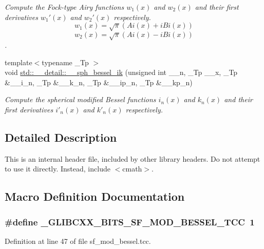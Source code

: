 \begin{DoxyCompactItemize}
\begin{DoxyCompactList}\small\item\em Compute the Fock-\/type Airy functions $ w_1(x) $ and $ w_2(x) $ and their first derivatives $ w_1'(x) $ and $ w_2'(x) $ respectively. \[ w_1(x) = \sqrt{\pi}(Ai(x) + iBi(x)) \] \[ w_2(x) = \sqrt{\pi}(Ai(x) - iBi(x)) \]. \end{DoxyCompactList}\item 
{\footnotesize template$<$typename \+\_\+\+Tp $>$ }\\void \hyperlink{namespacestd_1_1____detail_a35edea916ec9c8310f7d4a06618f7378}{std\+::\+\_\+\+\_\+detail\+::\+\_\+\+\_\+sph\+\_\+bessel\+\_\+ik} (unsigned int \+\_\+\+\_\+n, \+\_\+\+Tp \+\_\+\+\_\+x, \+\_\+\+Tp \&\+\_\+\+\_\+i\+\_\+n, \+\_\+\+Tp \&\+\_\+\+\_\+k\+\_\+n, \+\_\+\+Tp \&\+\_\+\+\_\+ip\+\_\+n, \+\_\+\+Tp \&\+\_\+\+\_\+kp\+\_\+n)
\begin{DoxyCompactList}\small\item\em Compute the spherical modified Bessel functions $ i_n(x) $ and $ k_n(x) $ and their first derivatives $ i'_n(x) $ and $ k'_n(x) $ respectively. \end{DoxyCompactList}\end{DoxyCompactItemize}


\subsection{Detailed Description}
This is an internal header file, included by other library headers. Do not attempt to use it directly. Instead, include $<$cmath$>$. 

\subsection{Macro Definition Documentation}
\subsubsection[{\texorpdfstring{\+\_\+\+G\+L\+I\+B\+C\+X\+X\+\_\+\+B\+I\+T\+S\+\_\+\+S\+F\+\_\+\+M\+O\+D\+\_\+\+B\+E\+S\+S\+E\+L\+\_\+\+T\+CC}{_GLIBCXX_BITS_SF_MOD_BESSEL_TCC}}]{\setlength{\rightskip}{0pt plus 5cm}\#define \+\_\+\+G\+L\+I\+B\+C\+X\+X\+\_\+\+B\+I\+T\+S\+\_\+\+S\+F\+\_\+\+M\+O\+D\+\_\+\+B\+E\+S\+S\+E\+L\+\_\+\+T\+CC~1}\hypertarget{sf__mod__bessel_8tcc_a746f247a80ce9ef275dfb1cffbabeabd}{}\label{sf__mod__bessel_8tcc_a746f247a80ce9ef275dfb1cffbabeabd}


Definition at line 47 of file sf\+\_\+mod\+\_\+bessel.\+tcc.

